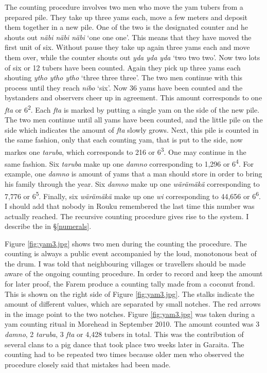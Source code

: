The counting procedure involves two men who move the yam tubers from a prepared pile. They take up three yams each, move a few meters and deposit them together in a new pile. One of the two is the designated counter and he shouts out \emph{näbi näbi näbi} `one one one'. This means that they have moved the first unit of six. Without pause they take up again three yams each and move them over, while the counter shouts out \emph{yda yda yda} `two two two'. Now two lots of six or 12 tubers have been counted. Again they pick up three yams each shouting \emph{ytho ytho ytho} `three three three'. The two men continue with this process until they reach \emph{nibo} `six'. Now 36 yams have been counted and the bystanders and observers cheer up in agreement. This amount corresponds to one \emph{fta} or 6\textsuperscript{2}. Each \emph{fta} is marked by putting a single yam on the side of the new pile. The two men continue until all yams have been counted, and the little pile on the side which indicates the amount of \emph{fta} slowly grows. Next, this pile is counted in the same fashion, only that each counting yam, that is put to the side, now markes one \emph{taruba}, which corresponds to 216 or 6\textsuperscript{3}. One may continue in the same fashion. Six \emph{taruba} make up one \emph{damno} corresponding to 1,296 or 6\textsuperscript{4}. For example, one \emph{damno} is amount of yams that a man should store in order to bring his family through the year. Six \emph{damno} make up one \emph{wärämäkä} corresponding to 7,776 or 6\textsuperscript{5}. Finally, six \emph{wärämäkä} make up one \emph{wi} corresponding to 44,656 or 6\textsuperscript{6}. I should add that nobody in Rouku remembered the last time this number was actually reached. The recursive counting procedure gives rise to the  system. I describe the  in \S\ref{numerals}.%

Figure \ref{fig:yam3.jpg} shows two men during the counting the procedure. The counting is always a public event accompanied by the loud, monotonous beat of the drum. I was told that neighbouring villages or travellers should be made aware of the ongoing counting procedure. In order to record and keep the amount for later proof, the Farem produce a counting tally made from a coconut frond. This is shown on the right side of Figure \ref{fig:yam3.jpg}. The stalks indicate the amount of different  values, which are separated by small notches. The red arrows in the image point to the two notches. Figure  \ref{fig:yam3.jpg} was taken during a yam counting ritual in Morehead in September 2010. The amount counted was 3 \emph{damno}, 2 \emph{taruba}, 3 \emph{fta} or 4,428 tubers in total. This was the contribution of several clans to a pig dance that took place two weeks later in Garaita. The counting had to be repeated two times because older men who observed the procedure closely said that mistakes had been made.%

